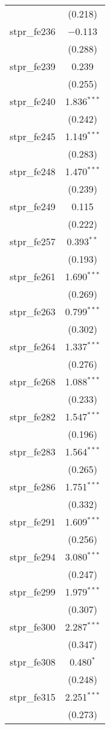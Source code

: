 \begin{table}[!htbp]
\begin{tabular}{@{\extracolsep{5pt}}lc}
  & (0.218) \\ 
  stpr\_fe236 & $-$0.113 \\ 
  & (0.288) \\ 
  stpr\_fe239 & 0.239 \\ 
  & (0.255) \\ 
  stpr\_fe240 & 1.836$^{***}$ \\ 
  & (0.242) \\ 
  stpr\_fe245 & 1.149$^{***}$ \\ 
  & (0.283) \\ 
  stpr\_fe248 & 1.470$^{***}$ \\ 
  & (0.239) \\ 
  stpr\_fe249 & 0.115 \\ 
  & (0.222) \\ 
  stpr\_fe257 & 0.393$^{**}$ \\ 
  & (0.193) \\ 
  stpr\_fe261 & 1.690$^{***}$ \\ 
  & (0.269) \\ 
  stpr\_fe263 & 0.799$^{***}$ \\ 
  & (0.302) \\ 
  stpr\_fe264 & 1.337$^{***}$ \\ 
  & (0.276) \\ 
  stpr\_fe268 & 1.088$^{***}$ \\ 
  & (0.233) \\ 
  stpr\_fe282 & 1.547$^{***}$ \\ 
  & (0.196) \\ 
  stpr\_fe283 & 1.564$^{***}$ \\ 
  & (0.265) \\ 
  stpr\_fe286 & 1.751$^{***}$ \\ 
  & (0.332) \\ 
  stpr\_fe291 & 1.609$^{***}$ \\ 
  & (0.256) \\ 
  stpr\_fe294 & 3.080$^{***}$ \\ 
  & (0.247) \\ 
  stpr\_fe299 & 1.979$^{***}$ \\ 
  & (0.307) \\ 
  stpr\_fe300 & 2.287$^{***}$ \\ 
  & (0.347) \\ 
  stpr\_fe308 & 0.480$^{*}$ \\ 
  & (0.248) \\ 
  stpr\_fe315 & 2.251$^{***}$ \\ 
  & (0.273) \\ 

\end{tabular}
\end{table}
